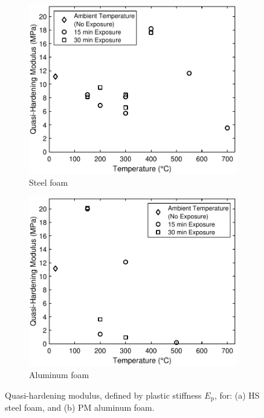 \documentclass[review]{elsarticle}
\begin{document}
\begin{figure}
	\centering
	\begin{subfigure}{0.50\textwidth}
		\centering
		\includegraphics[width=0.90\linewidth]
		{Tex-Figures/Fig18a_Quasi_Hardening_Modulus_Steel.pdf}
		\caption{Steel foam}
		\label{fig:Quasi-hardening-modulus_Steel}
	\end{subfigure}%
	\begin{subfigure}{0.50\textwidth}
		\centering
		\includegraphics[width=0.90\linewidth]
		{Tex-Figures/Fig18b_Quasi_Hardening_Modulus_Aluminum.pdf}
		\caption{Aluminum foam}
		\label{fig:Quasi-hardening-modulus_Al}
	\end{subfigure}
	\caption{Quasi-hardening modulus, defined by plastic stiffness $E_\text{p}$, for: (a) HS steel foam, and (b) PM aluminum foam.}
	\label{fig:Quasi-hardening-modulus}
\end{figure}
\end{document}
